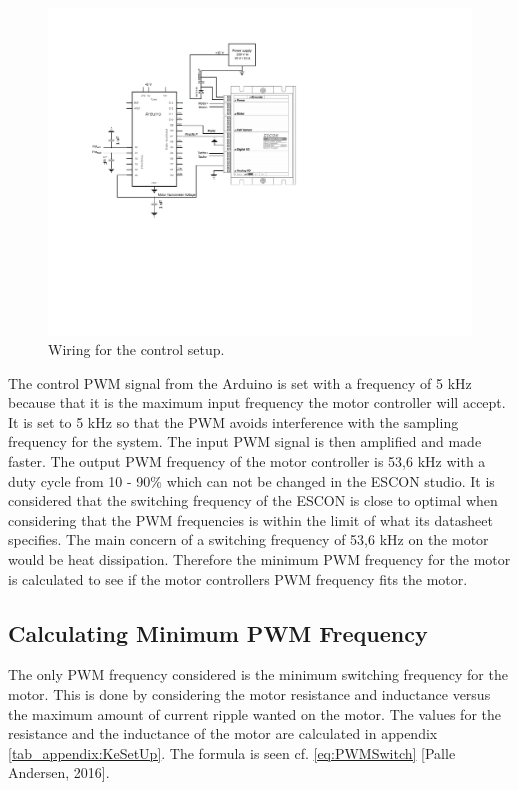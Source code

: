 \begin{figure}[htbp]
\centering
\includegraphics[width=0.85\linewidth]{figures/MotorControllerSetup}
\caption{Wiring for the control setup.}
\label{fig:EsconWiring}
\end{figure}
\newpage
The control PWM signal from the Arduino is set with a frequency of 5 kHz because that it is the maximum input frequency the motor controller will accept. It is set to 5 kHz so that the PWM avoids interference with the sampling frequency for the system.
The input PWM signal is then amplified and made faster. The output PWM frequency of the motor controller is 53,6 kHz with a duty cycle from 10 - 90\% which can not be changed in the ESCON studio. It is considered that the switching frequency of the ESCON is close to optimal when considering that the PWM frequencies is within the limit of what its datasheet specifies.   The main concern of a switching frequency of 53,6 kHz on the motor would be heat dissipation. Therefore the minimum PWM frequency for the motor is calculated to see if the motor controllers PWM frequency fits the motor.

\subsection{Calculating Minimum PWM Frequency}
The only PWM frequency considered is the minimum switching frequency for the motor. This is done by considering the motor resistance and inductance versus the maximum amount of current ripple wanted on the motor. The values for the resistance and the inductance of the motor are calculated in appendix \ref{tab_appendix:KeSetUp}. The formula is seen cf. \ref{eq:PWMSwitch} [Palle Andersen, 2016].

